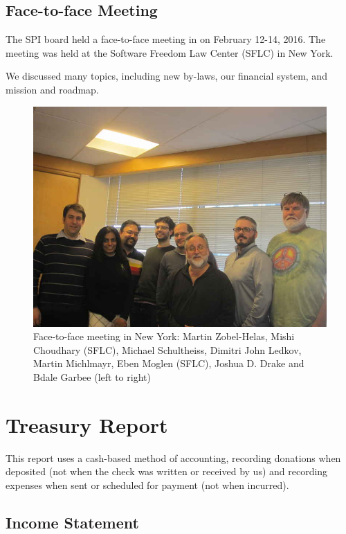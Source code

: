 \documentclass[letterpaper]{report}
\begin{document}
\section{Face-to-face Meeting}

The SPI board held a face-to-face meeting in on February 12-14, 2016.
The meeting was held at the Software Freedom Law Center (SFLC) in New
York.

We discussed many topics, including new by-laws, our financial system,
and mission and roadmap.

\begin{figure}[h]
\centering

\includegraphics[scale=1.00]{images/2016-f2f}

\caption{Face-to-face meeting in New York: Martin Zobel-Helas, Mishi
Choudhary (SFLC), Michael Schultheiss, Dimitri John Ledkov, Martin
Michlmayr, Eben Moglen (SFLC), Joshua D. Drake and Bdale Garbee (left to
right)}

\end{figure}

\chapter{Treasury Report}

This report uses a cash-based method of accounting, recording donations when
deposited (not when the check was written or received by us) and recording
expenses when sent or scheduled for payment (not when incurred).

\section{Income Statement}
\end{document}

